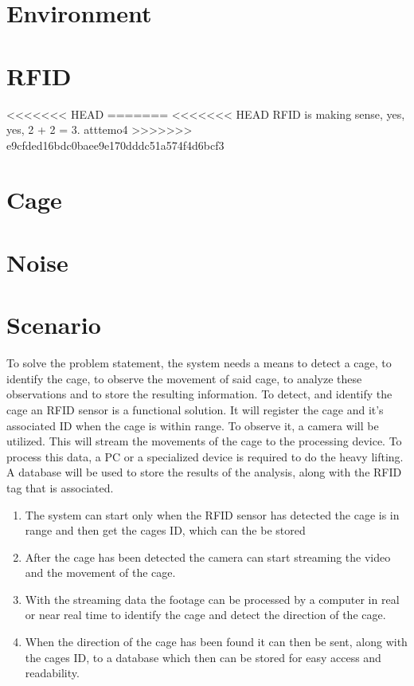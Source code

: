 \section{Environment}

\section{RFID}
<<<<<<< HEAD
=======
<<<<<<< HEAD
RFID is making sense, yes, yes, 2 + 2 = 3.
atttemo4
>>>>>>> e9cfded16bdc0baee9e170dddc51a574f4d6bcf3


\section{Cage}

\section{Noise}

\section{Scenario}

To solve the problem statement, the system needs a means to detect a cage, to identify the cage, to observe the movement of said cage, to analyze these observations and to store the resulting information. To detect, and identify the cage an RFID sensor is a functional solution. It will register the cage and it's associated ID when the cage is within range. To observe it, a camera will be utilized. This will stream the movements of the cage to the processing device. To process this data, a PC or a specialized device is required to do the heavy lifting. A database will be used to store the results of the analysis, along with the RFID tag that is associated.

\begin{enumerate}
    \item The system can start only when the RFID sensor has detected the cage is in range and then get the cages ID, which can the be stored
    \item After the cage has been detected the camera can start streaming the video and the movement of the cage.
    \item With the streaming data the footage can be processed by a computer in real or near real time to identify the cage and detect the direction of the cage.
    \item When the direction of the cage has been found it can then be sent, along with the cages ID, to a database which then can be stored for easy access and readability.
\end{enumerate}

